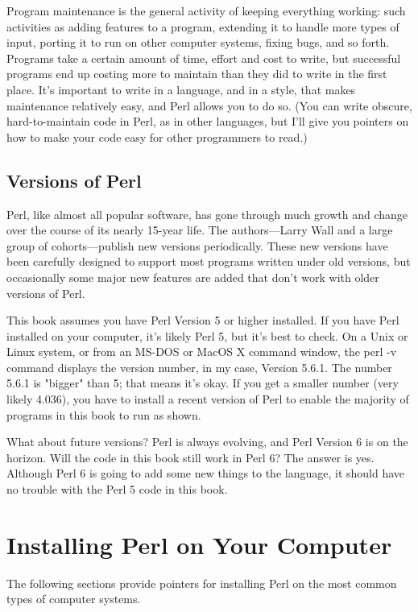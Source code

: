Program maintenance is the general activity of keeping everything working: such activities as adding features to a program, extending it to handle more types of input, porting it to run on other computer systems, fixing bugs, and so forth. Programs take a certain amount of time, effort and cost to write, but successful programs end up costing more to maintain than they did to write in the first place. It's important to write in a language, and in a style, that makes maintenance relatively easy, and Perl allows you to do so. (You can write obscure, hard-to-maintain code in Perl, as in other languages, but I'll give you pointers on how to make your code easy for other programmers to read.)

\subsection{Versions of Perl}
Perl, like almost all popular software, has gone through much growth and change over the course of its nearly 15-year life. The authors—Larry Wall and a large group of cohorts—publish new versions periodically.  These new versions have been carefully designed to support most programs written under old versions, but occasionally some major new features are added that don't work with older versions of Perl.

This book assumes you have Perl Version 5 or higher installed. If you have Perl installed on your computer, it's likely Perl 5, but it's best to check. On a Unix or Linux system, or from an MS-DOS or MacOS X command window, the perl -v command displays the version number, in my case, Version 5.6.1. The number 5.6.1 is "bigger" than 5; that means it's okay. If you get a smaller number (very likely 4.036), you have to install a recent version of Perl to enable the majority of programs in this book to run as shown.

What about future versions? Perl is always evolving, and Perl Version 6 is on the horizon. Will the code in this book still work in Perl 6? The answer is yes. Although Perl 6 is going to add some new things to the language, it should have no trouble with the Perl 5 code in this book. 

\section{Installing Perl on Your Computer}
The following sections provide pointers for installing Perl on the most common types of computer systems.


